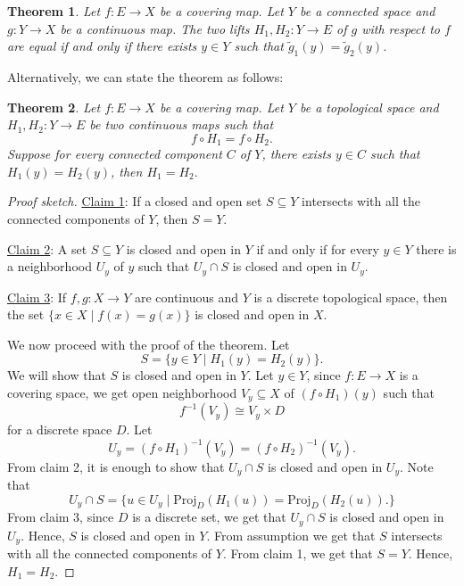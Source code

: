 \documentclass[12pt]{article}
\newtheorem{theorem}{Theorem}
\begin{document}
\begin{theorem}
    Let $f:E\to X$ be a covering map. Let $Y$ be a connected space  and $g:Y\to X$ be a continuous map. The two lifts $H_1,H_2:Y\to E$ of $g$ with respect to $f$ are equal if and only if there exists $y\in Y$ such that $\tilde{g}_1(y) = \tilde{g}_2(y)$.
\end{theorem}




Alternatively, we can state the theorem as follows:


\begin{theorem}
    Let $f:E\to X$ be a covering map. Let $Y$ be a topological space and $H_1, H_2:Y\to E$ be two continuous maps such that $$f\circ H_1 = f\circ H_2.$$
    Suppose for every connected component $C$ of $Y$, there exists $y\in C$ such that $H_1(y) = H_2(y)$, then $H_1 = H_2.$
\end{theorem}


\begin{proof}[Proof sketch]
    \underline{Claim 1}: If a closed and open set $S \subseteq  Y$ intersects with all the connected components of $Y$, then $S=Y$.

    \underline{Claim 2}:  A set $S \subseteq Y$ is closed and open in $Y$ if and only if for every $y \in Y$
    there is a neighborhood $U_y$ of $y$ such that $U_y \cap S$ is closed and open in $U_y$.

    \underline{Claim 3}: If $f, g : X \to Y$ are continuous and $Y$ is a discrete topological space, then the set $\{x \in X \mid f(x) = g(x)\}$ is closed and open in $X$.
    
    We now proceed with the proof of the theorem.
    Let $$S=\{y\in Y\mid H_1(y) = H_2(y)\}.$$ We will show that $S$ is closed and open in $Y$. Let $y\in Y$, since $f:E\to X$ is a covering space, we get open neighborhood $V_y\subseteq X$ of $(f\circ H_1)(y)$ such that 
    \[
        f^{-1}(V_y) \cong V_y \times D
    \]
    for a discrete space $D$.
    Let 
    \[
        U_y = (f\circ H_1)^{-1}(V_y) = (f\circ H_2)^{-1}(V_y).
    \]  
    From claim 2, it is enough to show that $U_y\cap S$ is closed and open in $U_y$. Note that 
    \[
        U_y\cap S = \{u\in U_y\mid \text{Proj}_D(H_1(u)) = \text{Proj}_D(H_2(u)).\}
    \] 
    From claim 3, since $D$ is a discrete set, we get that $U_y\cap S$ is closed and open in $U_y$. Hence, $S$ is closed and open in $Y$. From assumption we get that $S$ intersects with all the connected components of $Y$. From claim 1, we get that $S=Y$. Hence, $H_1 = H_2$.
\end{proof}
\end{document}
